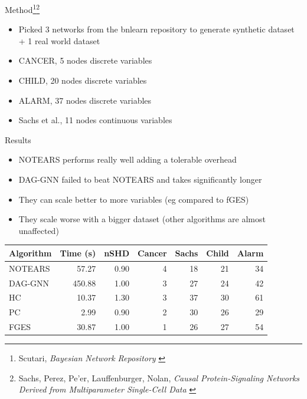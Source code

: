 \documentclass[aspectratio=169]{beamer}
\begin{document}
\begin{frame}{Method\footnote{Scutari, \emph{Bayesian Network Repository} \cite{bnlearn}}\footnote{Sachs, Perez, Pe'er, Lauffenburger, Nolan, \emph{Causal Protein-Signaling Networks Derived from Multiparameter Single-Cell Data} \cite{sachs2005causal}}}
    \begin{itemize}
        \item Picked 3 networks from the bnlearn repository to generate synthetic dataset + 1 real world dataset
        \item CANCER, 5 nodes discrete variables
        \item CHILD, 20 nodes discrete variables
        \item ALARM, 37 nodes discrete variables
        \item Sachs et al., 11 nodes continuous variables
    \end{itemize}
\end{frame}

\begin{frame}{Results}
    \begin{itemize}
        \item NOTEARS performs really well adding a tolerable overhead
        \item DAG-GNN failed to beat NOTEARS and takes significantly longer
        \item They can scale better to more variables (eg compared to fGES)
        \item They scale worse with a bigger dataset (other algorithms are almost unaffected)
    \end{itemize}
    \begin{table}
        \centering
        \scriptsize
        \begin{tabular}{lrrrrrr}
        \toprule
        Algorithm & Time (s) & nSHD & Cancer & Sachs & Child & Alarm \\
        \midrule
        NOTEARS &  57.27 & 0.90 &  4 & 18 & 21 & 34 \\
        DAG-GNN & 450.88 & 1.00 &  3 & 27 & 24 & 42 \\
        HC      &  10.37 & 1.30 &  3 & 37 & 30 & 61 \\
        PC      &   2.99 & 0.90 &  2 & 30 & 26 & 29 \\
        FGES    &  30.87 & 1.00 &  1 & 26 & 27 & 54 \\
        \bottomrule
        \end{tabular}
    \end{table}
\end{frame}
\end{document}
